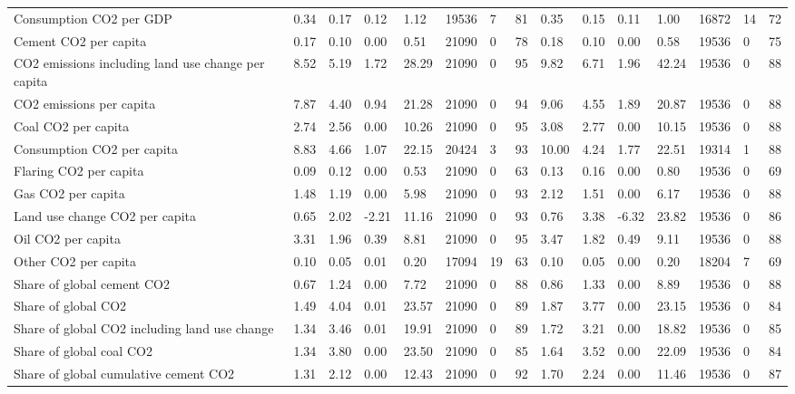 \begin{longtable}{lllllllllllllll}
\addlinespace
Consumption CO2 per GDP & 0.34 & 0.17 & 0.12 & 1.12 & 19536 & 7 & 81 & 0.35 & 0.15 & 0.11 & 1.00 & 16872 & 14 & 72\\
Cement CO2 per capita & 0.17 & 0.10 & 0.00 & 0.51 & 21090 & 0 & 78 & 0.18 & 0.10 & 0.00 & 0.58 & 19536 & 0 & 75\\
CO2 emissions including land use change per capita & 8.52 & 5.19 & 1.72 & 28.29 & 21090 & 0 & 95 & 9.82 & 6.71 & 1.96 & 42.24 & 19536 & 0 & 88\\
CO2 emissions per capita & 7.87 & 4.40 & 0.94 & 21.28 & 21090 & 0 & 94 & 9.06 & 4.55 & 1.89 & 20.87 & 19536 & 0 & 88\\
Coal CO2 per capita & 2.74 & 2.56 & 0.00 & 10.26 & 21090 & 0 & 95 & 3.08 & 2.77 & 0.00 & 10.15 & 19536 & 0 & 88\\
\addlinespace
Consumption CO2 per capita & 8.83 & 4.66 & 1.07 & 22.15 & 20424 & 3 & 93 & 10.00 & 4.24 & 1.77 & 22.51 & 19314 & 1 & 88\\
Flaring CO2 per capita & 0.09 & 0.12 & 0.00 & 0.53 & 21090 & 0 & 63 & 0.13 & 0.16 & 0.00 & 0.80 & 19536 & 0 & 69\\
Gas CO2 per capita & 1.48 & 1.19 & 0.00 & 5.98 & 21090 & 0 & 93 & 2.12 & 1.51 & 0.00 & 6.17 & 19536 & 0 & 88\\
Land use change CO2 per capita & 0.65 & 2.02 & -2.21 & 11.16 & 21090 & 0 & 93 & 0.76 & 3.38 & -6.32 & 23.82 & 19536 & 0 & 86\\
Oil CO2 per capita & 3.31 & 1.96 & 0.39 & 8.81 & 21090 & 0 & 95 & 3.47 & 1.82 & 0.49 & 9.11 & 19536 & 0 & 88\\
\addlinespace
Other CO2 per capita & 0.10 & 0.05 & 0.01 & 0.20 & 17094 & 19 & 63 & 0.10 & 0.05 & 0.00 & 0.20 & 18204 & 7 & 69\\
Share of global cement CO2 & 0.67 & 1.24 & 0.00 & 7.72 & 21090 & 0 & 88 & 0.86 & 1.33 & 0.00 & 8.89 & 19536 & 0 & 88\\
Share of global CO2 & 1.49 & 4.04 & 0.01 & 23.57 & 21090 & 0 & 89 & 1.87 & 3.77 & 0.00 & 23.15 & 19536 & 0 & 84\\
Share of global CO2 including land use change & 1.34 & 3.46 & 0.01 & 19.91 & 21090 & 0 & 89 & 1.72 & 3.21 & 0.00 & 18.82 & 19536 & 0 & 85\\
Share of global coal CO2 & 1.34 & 3.80 & 0.00 & 23.50 & 21090 & 0 & 85 & 1.64 & 3.52 & 0.00 & 22.09 & 19536 & 0 & 84\\
\addlinespace
Share of global cumulative cement CO2 & 1.31 & 2.12 & 0.00 & 12.43 & 21090 & 0 & 92 & 1.70 & 2.24 & 0.00 & 11.46 & 19536 & 0 & 87\\

\end{longtable}
